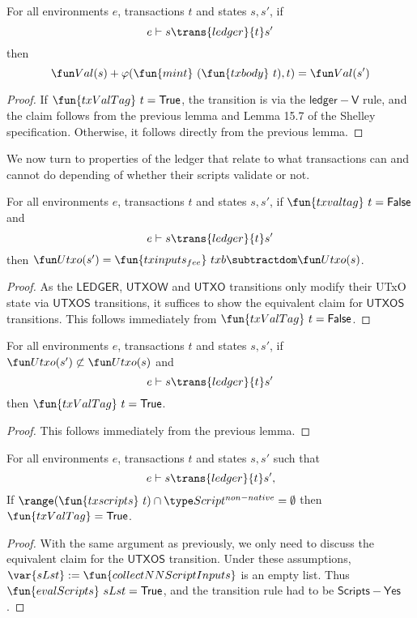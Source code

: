 \begin{lemma}
  For all environments $e$, transactions $t$ and states $s, s'$, if
  \begin{equation*}
    e\vdash s\trans{ledger}{t}s'
  \end{equation*}
  then
  \begin{equation*}
    \Val(s) + \varphi(\fun{mint}~(\fun{txbody}~t), t) = \Val(s')
  \end{equation*}
\end{lemma}
\begin{proof}
  If $\fun{txValTag}~t = \True$, the transition is via the
  $\mathsf{ledger-V}$ rule, and the claim follows from the previous lemma
  and Lemma 15.7 of the Shelley specification. Otherwise, it follows
  directly from the previous lemma.
\end{proof}

We now turn to properties of the ledger that relate to what
transactions can and cannot do depending of whether their scripts
validate or not.

\begin{lemma}
  For all environments $e$, transactions $t$ and states $s, s'$, if $\fun{txvaltag}~t = \False$ and
  \begin{equation*}
    e\vdash s\trans{ledger}{t}s'
  \end{equation*}
  then $\Utxo(s') = \fun{txinputs_{fee}}~{txb} \subtractdom \Utxo(s)$.
\end{lemma}
\begin{proof}
  As the $\mathsf{LEDGER}$, $\mathsf{UTXOW}$ and $\mathsf{UTXO}$ transitions
  only modify their UTxO state via $\mathsf{UTXOS}$ transitions, it
  suffices to show the equivalent claim for $\mathsf{UTXOS}$
  transitions. This follows immediately from $\fun{txValTag}~t = \False$.
\end{proof}

\begin{corollary}
  For all environments $e$, transactions $t$ and states $s, s'$, if
  $\Utxo(s') \not\subset \Utxo(s)$ and
  \begin{equation*}
    e\vdash s\trans{ledger}{t}s'
  \end{equation*}
  then $\fun{txValTag}~t = \True$.
\end{corollary}
\begin{proof}
  This follows immediately from the previous lemma.
\end{proof}

\begin{lemma}
  For all environments $e$, transactions $t$ and states $s, s'$ such that
  \begin{equation*}
    e\vdash s\trans{ledger}{t}s',
  \end{equation*}
  If $\range (\fun{txscripts}~t) \cap \ScriptNonNative = \emptyset$
  then $\fun{txValTag} = \True$.
\end{lemma}
\begin{proof}
  With the same argument as previously, we only need to discuss the
  equivalent claim for the $\mathsf{UTXOS}$ transition. Under these
  assumptions, $\var{sLst} := \fun{collectNNScriptInputs}$ is an empty
  list. Thus $\fun{evalScripts}~sLst = \True$, and the transition rule
  had to be $\mathsf{Scripts{-}Yes}$.
\end{proof}